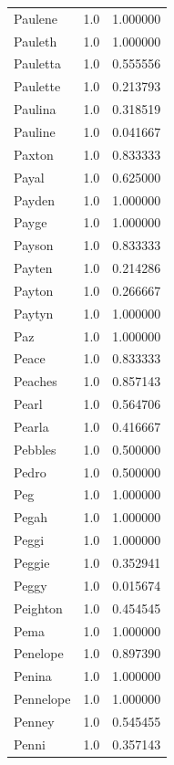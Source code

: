 \documentclass[
  letterpaper,
  DIV=11,
  numbers=noendperiod]{scrreprt}
\begin{document}
\begin{tabular}{lrr}
Paulene         &   1.0 &   1.000000 \\
Pauleth         &   1.0 &   1.000000 \\
Pauletta        &   1.0 &   0.555556 \\
Paulette        &   1.0 &   0.213793 \\
Paulina         &   1.0 &   0.318519 \\
Pauline         &   1.0 &   0.041667 \\
Paxton          &   1.0 &   0.833333 \\
Payal           &   1.0 &   0.625000 \\
Payden          &   1.0 &   1.000000 \\
Payge           &   1.0 &   1.000000 \\
Payson          &   1.0 &   0.833333 \\
Payten          &   1.0 &   0.214286 \\
Payton          &   1.0 &   0.266667 \\
Paytyn          &   1.0 &   1.000000 \\
Paz             &   1.0 &   1.000000 \\
Peace           &   1.0 &   0.833333 \\
Peaches         &   1.0 &   0.857143 \\
Pearl           &   1.0 &   0.564706 \\
Pearla          &   1.0 &   0.416667 \\
Pebbles         &   1.0 &   0.500000 \\
Pedro           &   1.0 &   0.500000 \\
Peg             &   1.0 &   1.000000 \\
Pegah           &   1.0 &   1.000000 \\
Peggi           &   1.0 &   1.000000 \\
Peggie          &   1.0 &   0.352941 \\
Peggy           &   1.0 &   0.015674 \\
Peighton        &   1.0 &   0.454545 \\
Pema            &   1.0 &   1.000000 \\
Penelope        &   1.0 &   0.897390 \\
Penina          &   1.0 &   1.000000 \\
Pennelope       &   1.0 &   1.000000 \\
Penney          &   1.0 &   0.545455 \\
Penni           &   1.0 &   0.357143 \\

\end{tabular}
\end{document}
